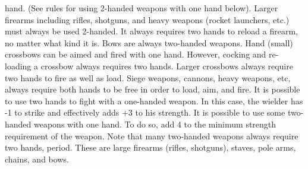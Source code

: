 \documentclass[twoside]{book}
\begin{document}
               hand. (See rules for using 2-handed weapons with one hand
               below). Larger firearms including rifles, shotguns, and
               heavy weapons (rocket launchers, etc.) must always be used
               2-handed. It always requires two hands to reload a
               firearm, no matter what kind it is.  Bows are always two-handed weapons. Hand (small)
               crossbows can be aimed and fired with one hand. However,
               cocking and re-loading a crossbow always requires two
               hands. Larger crossbows always require two hands to fire
               as well as load. Siege weapons, cannons, heavy weapons,
               etc, always require both hands to be free in order to
               load, aim, and fire.  It is possible to use two hands to fight with a
               one-handed weapon. In this case, the wielder has -1 to
               strike and effectively adds +3 to his strength.  It is possible to use some two-handed weapons with
               one hand. To do so, add 4 to the minimum strength
               requirement of the weapon. Note that many two-handed
               weapons always require two hands, period. These are large
               firearms (rifles, shotguns), staves, pole arms, chains,
               and bows. 
    
\end{document}
